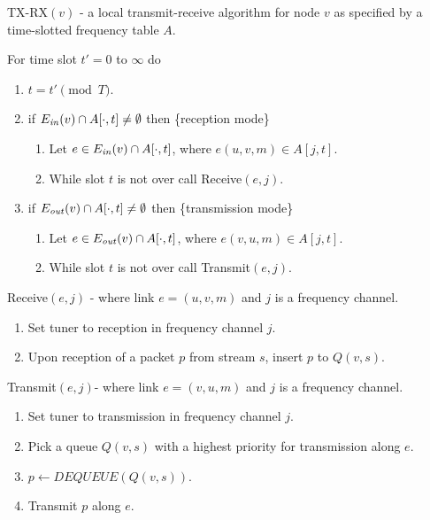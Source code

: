 \documentclass[12pt]{article}
\newenvironment{proof sketch}[1]{\noindent {\emph{Proof sketch of #1:}}}{\hfill \qed}
\newcommand{\Ein}{E_{\text{\emph{in}}}}
\newcommand{\Eout}{E_{\text{\emph{out}}}}
\begin{document}
\begin{algorithm}[H]
  \caption{TX-RX$(v)$ - a local transmit-receive algorithm for node
    $v$ as specified by a time-slotted frequency table $A$.}
\label{alg:tx-rx}
For time slot $t'=0$ to $\infty$ do
  \begin{enumerate}%
\item $t = t' \pmod T$.
  \item if $\Ein(v)\cap A[\cdot,t ]\neq \emptyset$ then
    \{reception mode\}
    \begin{enumerate}%
    \item Let $e\in \Ein(v)\cap A[\cdot,t]$, where $e(u,v,m)\in
      A[j,t]$.
    \item While slot $t$ is not over call Receive$(e,j)$.
    \end{enumerate}%
  \item if $\Eout(v)\cap A[\cdot,t ]\neq \emptyset$ then
    \{transmission mode\}
    \begin{enumerate}%
    \item Let $e\in \Eout(v)\cap A[\cdot,t ]$, where
      $e(v,u,m)\in A[j,t]$.
    \item While slot $t$ is not over call Transmit$(e,j)$.
    \end{enumerate}%
  \end{enumerate}%
Receive$(e,j)$ - where link $e=(u,v,m)$ and $j$ is a frequency channel.
\begin{enumerate}
\item Set tuner to reception in frequency channel $j$.
\item Upon reception of a packet $p$ from stream $s$, insert $p$ to $Q(v,s)$.
\end{enumerate}

Transmit$(e,j)$-  where link $e=(v,u,m)$ and $j$ is a frequency channel.
\begin{enumerate}
\item Set tuner to transmission in frequency channel $j$.
\item\label{line:priority} Pick a queue $Q(v,s)$ with a highest priority for transmission along $e$.
\item $p \gets DEQUEUE(Q(v,s))$.
\item Transmit $p$ along $e$.
\end{enumerate}
\end{algorithm}
\end{document}
